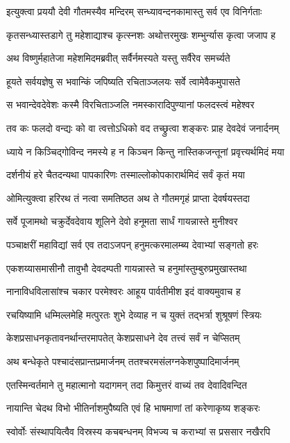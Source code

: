 \twolineshloka
{इत्युक्त्वा प्रययौ देवी गौतमस्यैव मन्दिरम्}
{सन्ध्यावन्दनकामास्तु सर्व एव विनिर्गताः}%

\twolineshloka
{कृतसन्ध्यास्तडागे तु महेशाद्याश्च कृत्स्नशः}
{अथोत्तरमुखः शम्भुर्न्यास कृत्वा जजाप ह}%

\twolineshloka
{अथ विष्णुर्महातेजा महेशमिदमब्रवीत्}
{सर्वैर्नमस्यते यस्तु सर्वैरेव समर्च्यते}%

\twolineshloka
{हूयते सर्वयज्ञेषु स भवान्किं जपिष्यति}
{रचिताञ्जलयः सर्वे त्वामेवैकमुपासते}%

\twolineshloka
{स भवान्देवदेवेशः कस्मै विरचिताञ्जलि}
{नमस्कारादिपुण्यानां फलदस्त्वं महेश्वर}%

\twolineshloka
{तव कः फलदो वन्द्यः को वा त्वत्तोऽधिको वद}
{तच्छ्रुत्वा शङ्करः प्राह देवदेवं जनार्दनम्}%

\twolineshloka
{ध्याये न किञ्चिद्गोविन्द नमस्ये ह न किञ्चन}
{किन्तु नास्तिकजन्तूनां प्रवृत्त्यर्थमिदं मया}%

\twolineshloka
{दर्शनीयं हरे चैतदन्यथा पापकारिणः}
{तस्माल्लोकोपकारार्थमिदं सर्वं कृतं मया}%

\twolineshloka
{ओमित्युक्त्वा हरिरथ तं नत्वा समतिष्ठत}
{अथ ते गौतमगृहं प्राप्ता देवर्षयस्तदा}%

\twolineshloka
{सर्वे पूजामथो चक्रुर्देवदेवाय शूलिने}
{देवो हनूमता सार्धं गायन्नास्ते मुनीश्वर}%

\twolineshloka
{पञ्चाक्षरीं महाविद्यां सर्व एव तदाऽजपन्}
{हनुमत्करमालम्ब्य देवाभ्यां सङ्गतो हरः}%

\twolineshloka
{एकशय्यासमासीनौ तावुभौ देवदम्पती}
{गायन्नास्ते च हनुमांस्तुम्बुरुप्रमुखास्तथा}%

\twolineshloka
{नानाविधविलासांश्च चकार परमेश्वरः}
{आहूय पार्वतीमीश इदं वाक्यमुवाच ह}%

\twolineshloka
{रचयिष्यामि धम्मिल्लमेहि मत्पुरतः शुभे}
{देव्याह न च युक्तं तद्भर्त्रा शुश्रूषणं स्त्रियः}%

\twolineshloka
{केशप्रसाधनकृतावनर्थान्तरमापतेत्}
{केशप्रसाधने देव तत्त्वं सर्वं न चेप्सितम्}%

\twolineshloka
{अथ बन्धेकृते पश्चादंसप्रान्तप्रमार्जनम्}
{ततश्चरमसंलग्नकेशपुष्पादिमार्जनम्}%

\twolineshloka
{एतस्मिन्वर्तमाने तु महात्मानो यदागमन्}
{तदा किमुत्तरं वाच्यं तव देवादिवन्दित}%

\twolineshloka
{नायान्ति चेदथ विभो भीतिर्नाशमुपैष्यति}
{एवं हि भाषमाणां तां करेणाकृष्य शङ्करः}%

\twolineshloka
{स्वोर्वोः संस्थापयित्वैव विस्रस्य कचबन्धनम्}
{विभज्य च कराभ्यां स प्रससार नखैरपि}%

